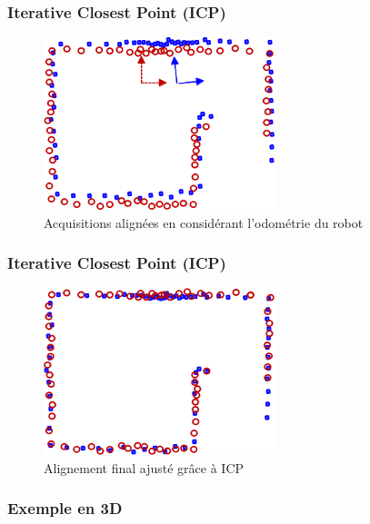     \begin{frame}
        \frametitle{Iterative Closest Point (ICP)}
            \begin{figure}                 
                \includegraphics[width=0.6\textwidth]{./media/odom_adjusted.png}
                \caption{Acquisitions alignées en considérant l'odométrie du robot}
            \end{figure}
    \end{frame}
    
    \begin{frame}
        \frametitle{Iterative Closest Point (ICP)}
            \begin{figure}                 
                \includegraphics[width=0.6\textwidth]{./media/final.png}
                \caption{Alignement final ajusté grâce à ICP}
            \end{figure}
    \end{frame}
    
    \begin{frame}
    	\frametitle{Exemple en 3D}
    	\centering
    \end{frame}
    
